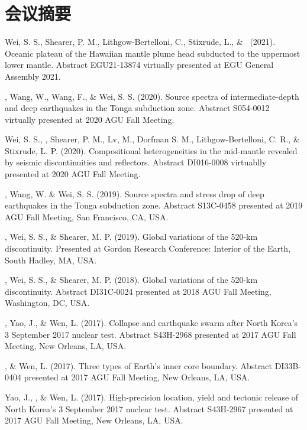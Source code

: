 \section*{会议摘要}

\begin{etaremune}
\item Wei, S. S., Shearer, P. M., Lithgow-Bertelloni, C., Stixrude, L., \& \Tian\ (2021).
	Oceanic plateau of the Hawaiian mantle plume head subducted to the uppermost lower mantle.
	Abstract EGU21-13874 virtually presented at EGU General Assembly 2021.
\item \Tian, Wang, W., Wang, F., \& Wei, S. S. (2020).
	Source spectra of intermediate-depth and deep earthquakes in the Tonga subduction zone.
	Abstract S054-0012 virtually presented at 2020 AGU Fall Meeting.
\item Wei, S. S., \Tian, Shearer, P. M., Lv, M., Dorfman S. M., Lithgow-Bertelloni, C. R., \& Stixrude, L. P. (2020).
	Compositional heterogeneities in the mid-mantle revealed by seismic discontinuities and reflectors.
	Abstract DI016-0008 virtuablly presented at 2020 AGU Fall Meeting.
\item \Tian, Wang, W. \& Wei, S. S. (2019).
	Source spectra and stress drop of deep earthquakes in the Tonga subduction zone.
	Abstract S13C-0458 presented at 2019 AGU Fall Meeting, San Francisco, CA, USA.
\item
    \Tian, Wei, S. S., \& Shearer, M. P. (2019).
    Global variations of the 520-km discontinuity.
    Presented at Gordon Research Conference: Interior of the Earth, South Hadley, MA, USA.
\item
    \Tian, Wei, S. S., \& Shearer, M. P. (2018).
    Global variations of the 520-km discontinuity.
    Abstract DI31C-0024 presented at 2018 AGU Fall Meeting, Washington, DC, USA.
\item
    \Tian, Yao, J., \& Wen, L. (2017).
    Collapse and earthquake swarm after North Korea's 3 September 2017 nuclear test.
    Abstract S43H-2968 presented at 2017 AGU Fall Meeting, New Orleans, LA, USA.
\item
    \Tian, \& Wen, L. (2017).
    Three types of Earth's inner core boundary.
    Abstract DI33B-0404 presented at 2017 AGU Fall Meeting, New Orleans, LA, USA.
\item
    Yao, J., \Tian, \& Wen, L. (2017).
    High-precision location, yield and tectonic release of North Korea's 3 September 2017 nuclear test.
    Abstract S43H-2967 presented at 2017 AGU Fall Meeting, New Orleans, LA, USA.
\item

\end{etaremune}
